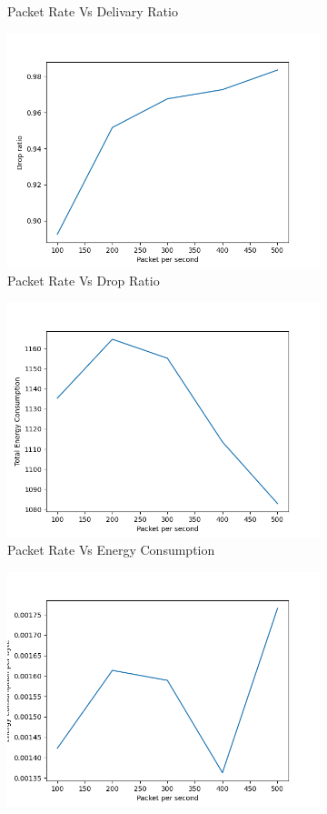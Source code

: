 \begin{figure}[h]
\begin{subfigure}{.5\textwidth}
     \caption{Packet Rate Vs Delivary Ratio}
     \label{packet_rate_delivery_mobile}
\end{subfigure}
\begin{subfigure}{.5\textwidth}
  \centering
  \includegraphics[width=.8\linewidth]{_11_2_mobile/PacketpersecondvsDropRatio.png}
     \caption{Packet Rate Vs Drop Ratio}
     \label{packet_rate_drop_mobile}
\end{subfigure}
\begin{subfigure}{.5\textwidth}
  \centering
  \includegraphics[width=.8\linewidth]{_11_2_mobile/PacketpersecondvsTotalEnergyConsumption.png}
     \caption{Packet Rate Vs Energy Consumption}
     \label{packet_rate_energy_mobile}
\end{subfigure}
\begin{subfigure}{.5\textwidth}
  \centering
  \includegraphics[width=.8\linewidth]{_11_2_mobile/PacketpersecondvsEnergyConsumptionperByte.png}

\end{subfigure}
\end{figure}
